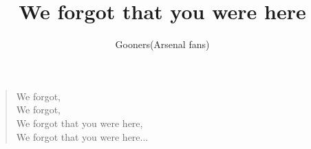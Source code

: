 \documentclass[a4paper,12pt]{article}
\title{We forgot that you were here}
\author{Gooners(Arsenal fans)}
\date{}
\begin{document}
	
	\maketitle
	
	\begin{verse}
		
		We forgot, \\
		We forgot, \\
		We forgot that you were here, \\
		We forgot that you were here$\ldots$
		
	\end{verse}
	
\end{document}
